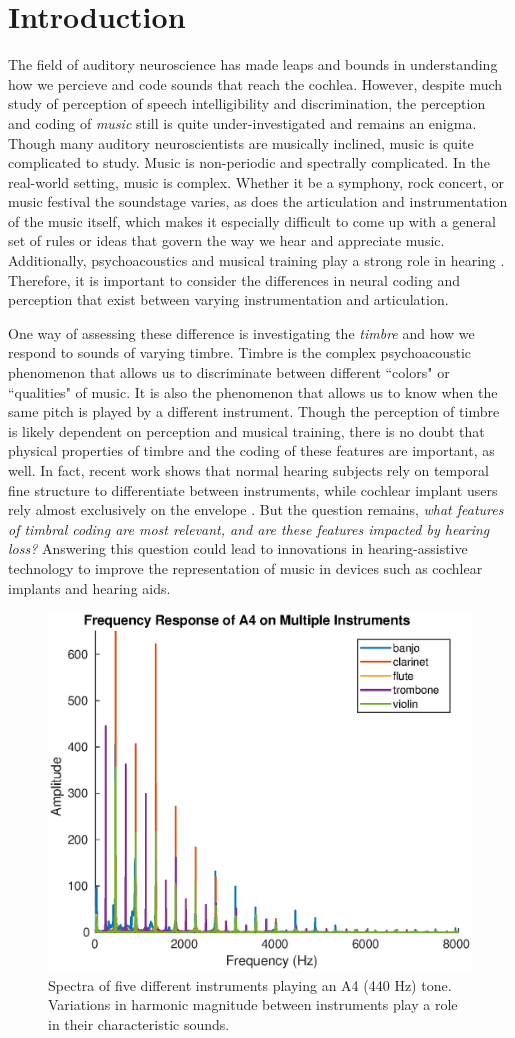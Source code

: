 \documentclass[conference]{IEEEtran}
\begin{document}
\section{Introduction}
The field of auditory neuroscience has made leaps and bounds in understanding how we percieve and code sounds that reach the cochlea. However, despite much study of perception of speech intelligibility and discrimination, the perception and coding of  \textit{music} still is quite under-investigated and remains an enigma. Though many auditory neuroscientists are musically inclined, music is quite complicated to study. Music is non-periodic and spectrally complicated. In the real-world setting, music is complex. Whether it be a symphony, rock concert, or music festival the soundstage varies, as does the articulation and instrumentation of the music itself, which makes it especially difficult to come up with a general set of rules or ideas that govern the way we hear and appreciate music. Additionally, psychoacoustics and musical training play a strong role in hearing \cite{bidelman_enhanced_2011}. Therefore, it is important to consider the differences in neural coding and perception that exist between varying instrumentation and articulation.

One way of assessing these difference is investigating the \textit{timbre} and how we respond to sounds of varying timbre. Timbre is the complex psychoacoustic phenomenon that allows us to discriminate between different ``colors" or ``qualities" of music. It is also the phenomenon that allows us to know when the same pitch is played by a different instrument. Though the perception of timbre is likely dependent on perception and musical training, there is no doubt that physical properties of timbre and the coding of these features are important, as well. In fact, recent work shows that normal hearing subjects rely on temporal fine structure to differentiate between instruments, while cochlear implant users rely almost exclusively on the envelope \cite{heng_impaired_2011}. But the question remains, \textit{what features of timbral coding are most relevant, and are these features impacted by hearing loss?} Answering this question could lead to innovations in hearing-assistive technology to improve the representation of music in devices such as cochlear implants and hearing aids.

\begin{figure}
\includegraphics[width = .5\textwidth]{fft_all}
\caption{Spectra of five different instruments playing an A4 (440 Hz) tone. Variations in harmonic magnitude between instruments play a role in their characteristic sounds.}
\label{fig:fft_all}
\end{figure}
\end{document}
